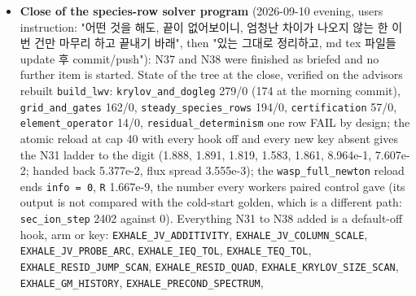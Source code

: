 \documentclass[english,a4paper]{my_memo}
\begin{document}
\begin{itemize}
  of three outer iterations, about four minutes on the carrier reload at cap
  40 and 8 threads. Also corrected in the reading: N35\textquotesingle s "there is no
  diagonal for a preconditioner to stand on" does not follow from the band
  row -\/- the diagonal is the size of the row, the disparity beside it is a
  column scale, and the near-singularity of the species-row compression of
  \texttt{A\ M\^{}-1} is a separate fact that the band-row ratio is not evidence for. Advisor: verified on the same final build (the suites above); atomic reload identical. Accepted; deliverable 3 correctly not built. N35\textquotesingle s sentence "no diagonal for a preconditioner to stand on" is withdrawn: the diagonal is the size of the row, the 3.3e3 is the momentum column scale (the sound speed) against a layer Mach number of 1e-3 to 1e-5, and column scalings are invisible to the cycle, so the near-singularity of the species-row compression is a fact of its own.
\item
  \textbf{Close of the species-row solver program} (2026-09-10 evening, user\textquotesingle s
  instruction: "어떤 것을 해도, 끝이 없어보이니, 엄청난 차이가 나오지 않는 한
  이번 건만 마무리 하고 끝내기 바래", then "있는 그대로 정리하고, md tex
  파일들 update 후 commit/push"): N37 and N38 were finished as briefed and
  no further item is started. State of the tree at the close, verified on
  the advisor\textquotesingle s rebuilt \texttt{build\_lwv}: \texttt{krylov\_and\_dogleg} 279/0 (174 at the
  morning commit), \texttt{grid\_and\_gates} 162/0, \texttt{steady\_species\_rows} 194/0,
  \texttt{certification} 57/0, \texttt{element\_operator} 14/0, \texttt{residual\_determinism} one
  row FAIL by design; the atomic reload at cap 40 with every hook off and
  every new key absent gives the N31 ladder to the digit (1.888, 1.891,
  1.819, 1.583, 1.861, 8.964e-1, 7.607e-2; handed back 5.377e-2, flux
  spread 3.555e-3); the \texttt{wasp\_full\_newton} reload ends \texttt{info\ =\ 0}, \texttt{\textbar{}\textbar{}R\textbar{}\textbar{}}
  1.667e-9, the number every worker\textquotesingle s paired control gave (its output is
  not compared with the cold-start golden, which is a different path:
  \texttt{sec\_ion\_step} 2402 against 0). Everything N31 to N38 added is a
  default-off hook, arm or key: \texttt{EXHALE\_JV\_ADDITIVITY},
  \texttt{EXHALE\_JV\_COLUMN\_SCALE}, \texttt{EXHALE\_JV\_PROBE\_ARC}, \texttt{EXHALE\_IEQ\_TOL},
  \texttt{EXHALE\_TEQ\_TOL}, \texttt{EXHALE\_RESID\_JUMP\_SCAN}, \texttt{EXHALE\_RESID\_QUAD},
  \texttt{EXHALE\_KRYLOV\_SIZE\_SCAN}, \texttt{EXHALE\_GM\_HISTORY}, \texttt{EXHALE\_PRECOND\_SPECTRUM},

\end{itemize}
\end{document}
